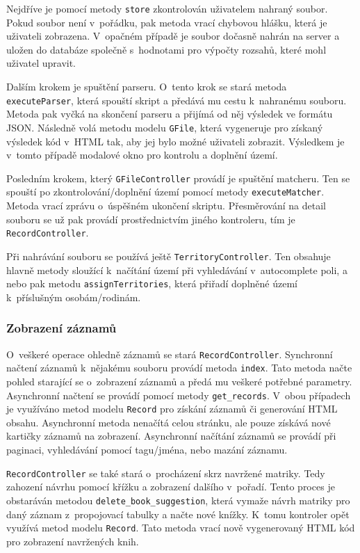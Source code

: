 Nejdříve je pomocí metody \verb|store| zkontrolován uživatelem nahraný soubor. Pokud soubor není v~pořádku, pak metoda vrací chybovou hlášku, která je uživateli zobrazena. V~opačném případě je soubor dočasně nahrán na server a uložen do databáze společně s~hodnotami pro výpočty rozsahů, které mohl uživatel upravit.

Dalším krokem je spuštění parseru. O~tento krok se stará metoda \verb|executeParser|, která spouští skript a předává mu cestu k~nahranému souboru. Metoda pak vyčká na skončení parseru a přijímá od něj výsledek ve formátu JSON. Následně volá metodu modelu \verb|GFile|, která vygeneruje pro získaný výsledek kód v~HTML tak, aby jej bylo možné uživateli zobrazit. Výsledkem je v~tomto případě modalové okno pro kontrolu a doplnění území.

Posledním krokem, který \verb|GFileController| provádí je spuštění matcheru. Ten se spouští po zkontrolování/doplnění území pomocí metody \verb|executeMatcher|. Metoda vrací zprávu o~úspěšném ukončení skriptu. Přesměrování na detail souboru se už pak provádí prostřednictvím jiného kontroleru, tím je \verb|RecordController|.

Při nahrávání souboru se používá ještě \verb|TerritoryController|. Ten obsahuje hlavně metody sloužící k~načítání území při vyhledávání v~autocomplete poli, a nebo pak metodu \verb|assignTerritories|, která přiřadí doplněné území k~příslušným osobám/rodinám.

\subsubsection{Zobrazení záznamů}
O~veškeré operace ohledně záznamů se stará \verb|RecordController|. Synchronní načtení záznamů k~nějakému souboru provádí metoda \verb|index|. Tato metoda načte pohled starající se o~zobrazení záznamů a předá mu veškeré potřebné parametry. Asynchronní načtení se provádí pomocí metody \verb|get_records|. V~obou případech je využíváno metod modelu \verb|Record| pro získání záznamů či generování HTML obsahu. Asynchronní metoda nenačítá celou stránku, ale pouze získává nové kartičky záznamů na zobrazení. Asynchronní načítání záznamů se provádí při paginaci, vyhledávání pomocí tagu/jména, nebo mazání záznamu.

\verb|RecordController| se také stará o~procházení skrz navržené matriky. Tedy zahození návrhu pomocí křížku a zobrazení dalšího v~pořadí. Tento proces je obstaráván metodou \verb|delete_book_suggestion|, která vymaže návrh matriky pro daný záznam z~propojovací tabulky a načte nové knížky. K~tomu kontroler opět využívá metod modelu \verb|Record|. Tato metoda vrací nově vygenerovaný HTML kód pro zobrazení navržených knih.

